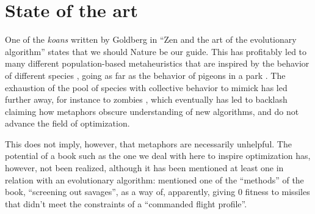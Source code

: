 \section{State of the art}


One of the {\em koans} written by Goldberg in ``Zen and the art of the
evolutionary algorithm'' states that we should Nature be our guide. This has
profitably led to many different population-based metaheuristics that are
inspired by the behavior of different species \cite{nedjah2020inspiration}, going as far as the behavior of
pigeons in a park \cite{blanco2019urban}. The exhaustion of the pool of
species with collective behavior to mimick has led further away, for instance to
zombies \cite{nguyen2012zombie}, which eventually has led to backlash
\cite{metaphor_exposed} claiming how metaphors obscure understanding of new
algorithms, and do not advance the field of optimization.

This does not imply, however, that metaphors are necessarily
unhelpful. The potential of a book such as the one we deal with here to inspire
optimization has, however, not been realized, although it has been
mentioned at least one in relation with an evolutionary algorithm:
\cite{wollam1999reverse} mentioned one of the ``methods'' of the book,
``screening out savages'', as a way of, apparently, giving 0 fitness
to missiles that didn't meet the constraints of a ``commanded flight
profile''.


